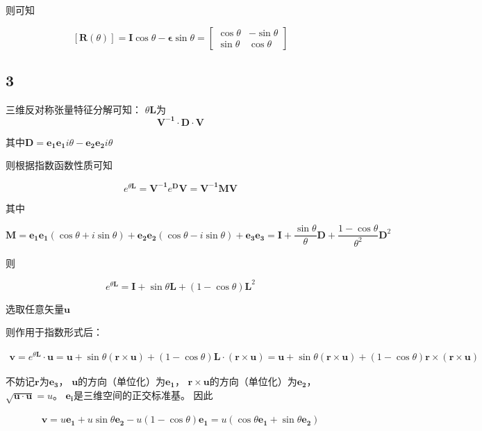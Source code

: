 \documentclass[UTF8,zihao=5]{ctexart}
\begin{document}
则可知

$$
[\bm{R}(\theta)]=\bm{I}\cos\theta-
\bm{\epsilon}\sin\theta=
\begin{bmatrix}
    \cos\theta&-\sin\theta\\\sin\theta&\cos\theta
\end{bmatrix}
$$

\subsection*{3}

三维反对称张量特征分解可知：
$\theta\bm{L}$为
$$
\bm{V^{-1}\cdot D\cdot V}
$$

其中$\bm{D}=\bm{e_1e_1}i\theta-\bm{e_2e_2}i\theta$

则根据指数函数性质可知

$$
e^{\theta\bm{L}}
=\bm{V^{-1}}e^{\bm{D}}\bm{V}
=\bm{V^{-1}}\bm{M}\bm{V}
$$

其中

$$
\bm{M}=\bm{e_1e_1}(\cos\theta+i\sin\theta)
+\bm{e_2e_2}(\cos\theta-i\sin\theta)
+\bm{e_3e_3}
=\bm{I}+\frac{\sin\theta}{\theta}\bm{D}
+\frac{1-\cos\theta}{\theta^2}\bm{D}^2
$$

则

$$
e^{\theta\bm{L}}
=\bm{I}+\sin\theta\bm{L}+(1-\cos\theta)\bm{L}^2
$$

选取任意矢量$\bm{u}$

则作用于指数形式后：

\begin{equation*}
    \begin{split}
        \bm{v}=e^{\theta\bm{L}}\cdot\bm{u}
        =\bm{u}+\sin\theta(\bm{r}\times\bm{u})
        +(1-\cos\theta)\bm{L}\cdot(\bm{r}\times\bm{u})
        =\bm{u}+\sin\theta(\bm{r}\times\bm{u})
        +(1-\cos\theta)\bm{r}\times(\bm{r}\times\bm{u})
    \end{split}
\end{equation*}

不妨记$\bm{r}$为$\bm{e_3}$，
$\bm{u}$的方向（单位化）为$\bm{e_1}$，
$\bm{r\times u}$的方向（单位化）为$\bm{e_2}$，
$\sqrt{\bm{u\cdot u}}=u$。
$\bm{e_i}$是三维空间的正交标准基。
因此

\begin{equation*}
    \begin{split}
        \bm{v}
        =u\bm{e_1}+u\sin\theta\bm{e_2}
        -u(1-\cos\theta)\bm{e_1}
        =u(\cos\theta \bm{e_1}+\sin\theta \bm{e_2})
    \end{split}
\end{equation*}
\end{document}
